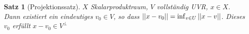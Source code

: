 \documentclass[ngerman]{report}
\theoremstyle{plain}%
\newtheorem{thm}{Satz}[chapter]
\theoremstyle{definition}%
\theoremstyle{myStyle}
\begin{document}
	\begin{thm}[Projektionssatz]
		$X$ Skalarproduktraum, $V$ vollständig UVR, $x\in X$. Dann existiert ein eindeutiges $v_0 \in V$, so dass $\left\lvert \left\lvert x - v_0 \right\rvert \right\rvert = \inf_{v\in U} \left\lvert \left\lvert x - v \right\rvert \right\rvert$. Dieses $v_0$ erfüllt $x - v_0 \in V^\perp$	
	\end{thm}

\end{document}
